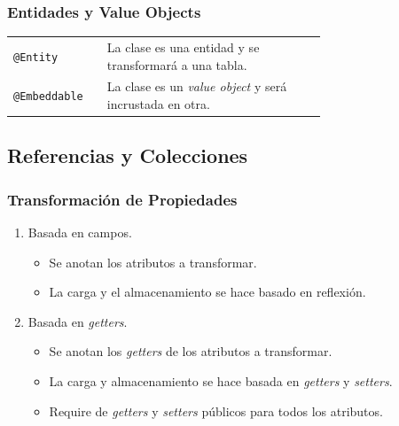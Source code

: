 \documentclass[a4paper,slidestop,xcolor=pst,blue]{beamer}
\newcommand{\ann}[1]{\color{blue}\texttt{#1}\color{black}}
\begin{document}
\begin{frame}[c]
    \frametitle{Entidades y Value Objects}
    \begin{tabular}{lp{0.70\linewidth}}
        \ann{@Entity}     & La clase es una entidad y se transformará a una tabla. \\
        \ann{@Embeddable} & La clase es un \emph{value object} y será incrustada en otra.
    \end{tabular}
\end{frame}

\subsection{Referencias y Colecciones}

\begin{frame}[c]
    \frametitle{Transformación de Propiedades}
    \begin{enumerate}[<+->]
        \item<1-> Basada en campos.
            \begin{itemize}
                \item<2-> Se anotan los atributos a transformar.
                \item<3-> La carga y el almacenamiento se hace basado en reflexión.
            \end{itemize}
        \item<3-> Basada en \emph{getters}.
            \begin{itemize}
                \item<4-> Se anotan los \emph{getters} de los atributos a transformar.
                \item<5-> La carga y almacenamiento se hace basada en \emph{getters} y \emph{setters}.
                \item<6-> Require de \emph{getters} y \emph{setters} públicos para todos los atributos.
            \end{itemize}
    \end{enumerate}
\end{frame}
\end{document}
